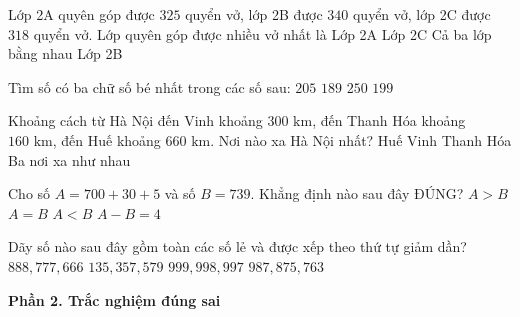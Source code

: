 \begin{ex} %
Lớp 2A quyên góp được $325$ quyển vở, lớp 2B được $340$ quyển vở, lớp 2C được $318$ quyển vở. Lớp quyên góp được nhiều vở nhất là
\choice
{Lớp 2A}
{Lớp 2C}
{Cả ba lớp bằng nhau}
{\True Lớp 2B}
\end{ex}

\begin{ex} %
Tìm số có ba chữ số bé nhất trong các số sau:
\choice
{$205$}
{\True $189$}
{$250$}
{$199$}
\end{ex}

\begin{ex} %
Khoảng cách từ Hà Nội đến Vinh khoảng $300\text{ km}$, đến Thanh Hóa khoảng $160\text{ km}$, đến Huế khoảng $660\text{ km}$. Nơi nào xa Hà Nội nhất?
\choice
{\True Huế}
{Vinh}
{Thanh Hóa}
{Ba nơi xa như nhau}
\end{ex}

\begin{ex} %
Cho số $A = 700 + 30 + 5$ và số $B = 739$. Khẳng định nào sau đây ĐÚNG?
\choice
{$A > B$}
{$A = B$}
{\True $A < B$}
{$A - B = 4$}
\end{ex}

\begin{ex} %
Dãy số nào sau đây gồm toàn các số lẻ và được xếp theo thứ tự giảm dần?
\choice
{$888, 777, 666$}
{$135, 357, 579$}
{$999, 998, 997$}
{\True $987, 875, 763$}
\end{ex}

\textbf{Phần 2. Trắc nghiệm đúng sai}

